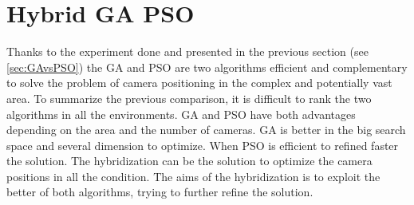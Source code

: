  







\section{Hybrid GA PSO }\label{sec:hybridGAPSO}
 

Thanks to the experiment done and presented in the previous section (see \ref{sec:GAvsPSO}) the GA and PSO are two algorithms efficient and complementary to solve the problem of camera positioning in the complex and potentially vast area.
  To summarize the previous comparison, it is difficult to rank the two algorithms in all the environments. GA and PSO have both advantages depending on the area and the number of cameras. GA is better in the big search space and several dimension to optimize. When PSO is efficient to refined faster the solution.
 The hybridization can be the solution to optimize the camera positions in all the condition. The aims of the hybridization is to exploit the better of both algorithms, trying to further refine the solution. 

